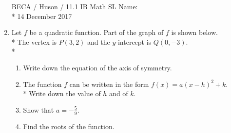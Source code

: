 \documentclass[]{book}
\begin{document}
\begin{enumerate}
\newpage
\noindent BECA / Huson / 11.1 IB Math SL \hspace{2in} Name:\\*
14 December 2017

\item Let $f$ be a quadratic function. Part of the graph of $f$ is shown below.\\*
The vertex is $P(3,2)$ and the $y$-intercept is $Q(0, -3)$.\\*

\begin{figure}[!htbp]
\begin{center}
\end{center}
\end{figure}

\begin{enumerate}
    \item Write down the equation of the axis of symmetry.
    \item The function $f$ can be written in the form $f(x)=a(x-h)^2 +k$. \\*
    Write down the value of $h$ and of $k$.
    \item Show that $a=-\frac{5}{9}$.
    \item Find the roots of the function.
\end{enumerate}


\end{enumerate}
\end{document}
